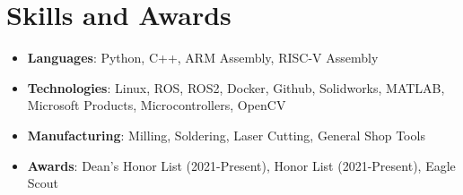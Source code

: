 \documentclass[letterpaper,10pt]{article}
\makeatletter
\newcommand{\resumeItem}[2]{
  \item\small{
    \textbf{#1}{: #2 \vspace{-2pt}}
  }
}
\newcommand{\resumeSubheading}[4]{
  \vspace{-1pt}\item
    \begin{tabular*}{0.97\textwidth}{l@{\extracolsep{\fill}}r}
      \textbf{#1} & \textbf{#2} \\
      \textit{#3} & \textit{#4} \\
    \end{tabular*}\vspace{-5pt}
}
\newcommand{\resumeSubItem}[2]{\resumeItem{#1}{#2}\vspace{-3pt}}
\newcommand{\resumeSubHeadingListStart}{\begin{itemize}[leftmargin=*]}
\newcommand{\resumeSubHeadingListEnd}{\end{itemize}}
\makeatother
\begin{document}
\section{Skills and Awards}
	\resumeSubHeadingListStart
        \resumeSubItem{Languages}{Python, C++, ARM Assembly, RISC-V Assembly} %
        \resumeSubItem{Technologies}{Linux, ROS, ROS2, Docker, Github, Solidworks, MATLAB, Microsoft Products, Microcontrollers, OpenCV} %
        \resumeSubItem{Manufacturing}{Milling, Soldering, Laser Cutting, General Shop Tools}
        \resumeSubItem{Awards}{Dean's Honor List (2021-Present), Honor List (2021-Present), Eagle Scout}
    \resumeSubHeadingListEnd
\vspace{-5pt}



\end{document}
